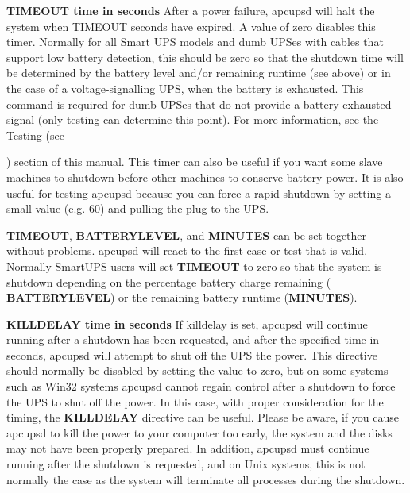 {{{{{{{\begin{description}
\item {\bf TIMEOUT \lt{}time in seconds\gt{}}
   After a power failure, apcupsd will halt the system when TIMEOUT seconds have
expired.  A value of zero disables this timer. Normally for all Smart UPS
models and dumb UPSes with cables that support low battery detection, this
should be zero so that the shutdown time will be determined by the battery
level and/or remaining runtime (see above) or in the case of a
voltage-signalling UPS, when the battery is exhausted.  This command is
required for dumb UPSes that do not provide a battery exhausted signal (only
testing can determine this point).  For more information, see the Testing (see

) section of this manual. 
This timer can also be useful if you want some slave machines to shutdown
before other machines to conserve battery power.  It is also useful for
testing apcupsd because you can force a rapid shutdown by setting a small
value (e.g.  60) and pulling the plug to the UPS.  

{\bf TIMEOUT}, {\bf BATTERYLEVEL}, and {\bf MINUTES} can be set together
without problems.  apcupsd will react to the first case or test that is valid.
Normally SmartUPS users will set {\bf TIMEOUT} to zero so that the system is
shutdown depending on the percentage battery charge remaining ({\bf
BATTERYLEVEL}) or the remaining battery runtime ({\bf MINUTES}).  

\label{KILLDELAY-_003ctime-in-seconds_003e}

\item {\bf KILLDELAY \lt{}time in seconds\gt{}}
   If killdelay is set, apcupsd will continue running after a shutdown has been
requested, and after the specified time in seconds, apcupsd will attempt to
shut off the UPS the power. This directive should normally be disabled by
setting the value to zero, but on some systems such as Win32 systems apcupsd
cannot regain control after a shutdown to force the UPS to shut off the power.
In this case, with proper consideration for the timing, the {\bf KILLDELAY}
directive can be useful.  Please be aware, if you cause apcupsd to kill the
power to your computer too early, the system and the disks may not have been
properly prepared.  In addition, apcupsd must continue running after the
shutdown is requested, and on Unix systems, this is not normally the case as
the system will terminate all processes during the shutdown.  
\end{description}

}}}}}}}
